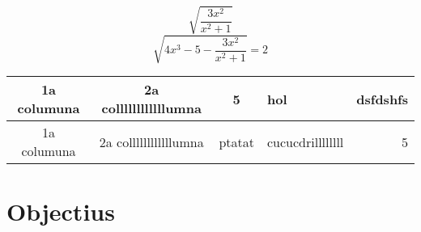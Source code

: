 \documentclass[a4paper,12pt]{book}
\begin{document}
$$\sqrt{\frac{3x^2}{x^2 +1}}$$
$$\sqrt{{4x^3 -5} - \frac{3x^2}{x^2 +1}} = 2$$



\vspace*{4.3truecm}


\begin{tabular}{|cc|c|l|r|}
 \hline 1a columuna & 2a collllllllllllumna & 5 & hol & dsfdshfs\\ \hline
 1a columuna & 2a collllllllllllumna & ptatat & cucucdrillllllll & 5 \\ \hline

\end{tabular}

% 
\chapter{Objectius}

%
% 
%
% 
%
% 
%
% 
%
% 
%




\appendix
% 
%
% 
%
% 



\renewcommand\bibname{Bibliografia}


\label{b:bibliography}

\end{document}
